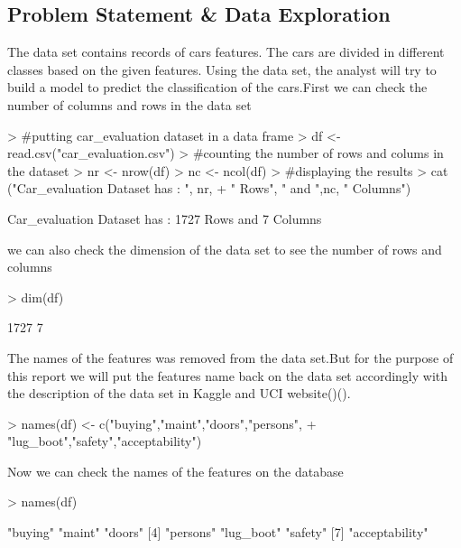 \documentclass{article}
\begin{document}
\subsection{Problem Statement \&  Data Exploration}
The data set contains records of cars features. The cars are divided in different classes based on the given features. Using the data set, the analyst will try to build a model to predict the classification of the cars.First we can check the number of columns and rows in the data set
\begin{Schunk}
\begin{Sinput}
> #putting car_evaluation dataset in a data frame
> df <- read.csv("car_evaluation.csv")
> #counting the number of rows and colums in the dataset
> nr <- nrow(df)
> nc <- ncol(df)
> #displaying the results
> cat ("Car_evaluation Dataset has : ", nr,
+               " Rows", " and ",nc, " Columns")
\end{Sinput}
\begin{Soutput}
Car_evaluation Dataset has :  1727  Rows  and  7  Columns
\end{Soutput}
\end{Schunk}
we can also check the dimension of the data set to see the number of rows and columns 
\begin{Schunk}
\begin{Sinput}
> dim(df)
\end{Sinput}
\begin{Soutput}
[1] 1727    7
\end{Soutput}
\end{Schunk}
The names of the features was removed from the data set.But for the purpose of this report we will put the features name back on the data set accordingly with the  description of the data set in Kaggle and UCI website(\textcite{Kaggle})(\textcite{UCI}).
\begin{Schunk}
\begin{Sinput}
> names(df) <- c("buying","maint","doors","persons",
+                         "lug_boot","safety","acceptability")
\end{Sinput}
\end{Schunk}
Now we can check the names of the features on the database
\begin{Schunk}
\begin{Sinput}
> names(df)
\end{Sinput}
\begin{Soutput}
[1] "buying"        "maint"         "doors"        
[4] "persons"       "lug_boot"      "safety"       
[7] "acceptability"
\end{Soutput}
\end{Schunk}
\end{document}
